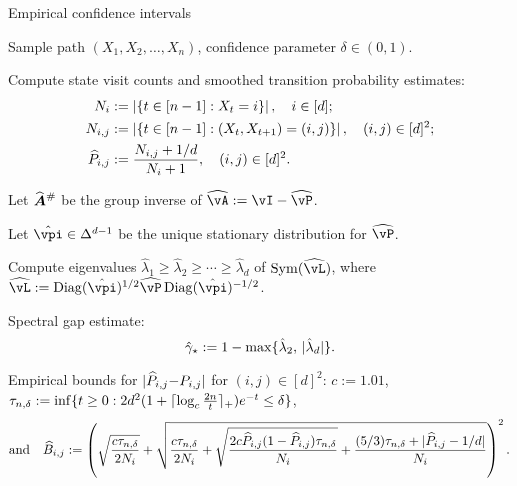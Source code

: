 \begin{algorithm}
\caption{Empirical confidence intervals}
\label{alg:empest}
\begin{algorithmic}[1]
  \renewcommand\algorithmicrequire{\textbf{Input}:}
  \REQUIRE
    Sample path $(X_1,X_2,\dots,X_n)$,
    confidence parameter $\delta \in (0,1)$.

  \STATE Compute state visit counts and smoothed transition
  probability estimates:
  \begin{equation}
    \begin{aligned}
      N_i & :=
      \left|
        \left\{
          t \in [n-1] : X_t = i
        \right\}
      \right|
      , \quad i \in [d] ; \\
      N_{i,j} & :=
      \left|
        \left\{
          t \in [n-1] : (X_t,X_{t+1}) = (i,j)
        \right\}
      \right|
      , \quad (i,j) \in [d]^2 ; \\
      \widehat{P}_{i,j}
      & :=
      \frac{N_{i,j} + 1/d}{N_i + 1}
      , \quad (i,j) \in [d]^2 .
    \end{aligned}
    \notag
  \end{equation}
  \label{step:P}

  \STATE Let $\giAh$ be the group inverse of $\wh\vA := \vI -
  \wh\vP$.
  \label{step:gi}

  \STATE Let $\hat\vpi \in \Delta^{d-1}$ be the unique stationary
  distribution for $\wh\vP$.
  \label{step:pi}

  \STATE Compute eigenvalues $\hat\lambda_1 {\geq} \hat\lambda_2
  {\geq} \dotsb {\geq} \hat\lambda_d$ of $\Sym(\wh\vL)$, where $\wh\vL
  := \Diag(\hat\vpi)^{1/2} \wh\vP \Diag(\hat\vpi)^{-1/2}$.
  \label{step:eig}

  \STATE Spectral gap estimate:
  \[ \hat\gamma_{\star} := 1 - \max\{ \hat\lambda_2,\, |\hat\lambda_d| \} . \]
  \label{step:gap}

  \STATE Empirical bounds for $|\widehat{P}_{i,j}{-}P_{i,j}|$ for $(i,j){\in}[d]^2$:
  $c:=1.01$,
  $\tau_{n,\delta}
    := \inf
    \{
      t\geq0 :
      2d^2 ( 1 + \lceil\log_c\frac{2n}{t}\rceil_+ ) e^{-t} \leq
      \delta
    \}$,
  \begin{equation}
    \text{and} \quad
    \widehat{B}_{i,j}
    :=
    \left(
      \sqrt{\frac{c\tau_{n,\delta}}{2N_i}}
      + \sqrt{
        \frac{c\tau_{n,\delta}}{2N_i}
        + 
        \sqrt{\frac{2c\widehat{P}_{i,j}(1-\widehat{P}_{i,j})\tau_{n,\delta}}{N_i}}
        + \frac{(5/3)\tau_{n,\delta} + |\widehat{P}_{i,j}-1/d|}{N_i}
      }
    \right)^2
    .
    \notag
  \end{equation}
  \label{step:P-bound}


\end{algorithmic}
\end{algorithm}

